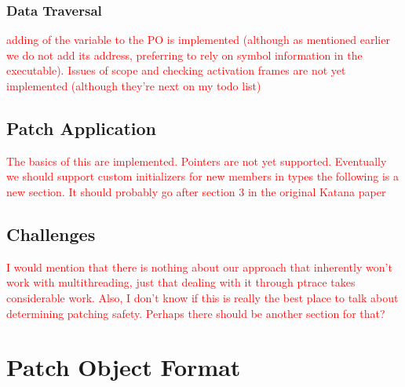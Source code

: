 \documentclass[a4paper,12pt]{article}
\begin{document}
\subsubsection{Data Traversal}
\textcolor{red}{adding of the variable to the PO is implemented
  (although as mentioned earlier we do not add its address, preferring
  to rely on symbol information in the executable). Issues of scope
  and checking activation frames are not yet implemented (although
  they're next on my todo list)}
\subsection{Patch Application}
\textcolor{red}{The basics of this are implemented. Pointers are not
  yet supported. Eventually we should support custom initializers for
  new members in types}
\vspace{1in}
\textcolor{red}{the following is a new section. It should probably go
  after section 3 in the original Katana paper}
\addtocounter{section}{-1}
\subsection{Challenges}
\textcolor{red}{I would mention that there is nothing about our
  approach that inherently won't work with multithreading, just that
  dealing with it through ptrace takes considerable work. Also, I
  don't know if this is really the best place to talk about
  determining patching safety. Perhaps there should be another section
  for that?}
\section{Patch Object Format}
\end{document}
